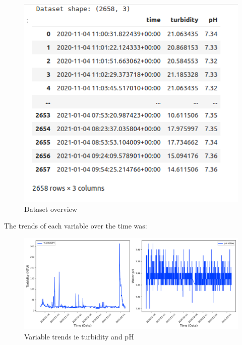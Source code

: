 \documentclass[12pt]{report}
\begin{document}
 \begin{figure}[h]
     \centering
     \includegraphics[scale = 0.3]{dataset.png}
     \caption{Dataset  overview}
     \label{fig:enter-label}
 \end{figure}
\par
The  trends  of  each variable  over  the  time  was:\\


\begin{figure}[h]
    \centering
    \includegraphics[width=0.5\linewidth]{vaiables_trend.png}
    \caption{Variable  trends ie  turbidity  and  pH}
    \label{fig:enter-label}
\end{figure}
\end{document}
